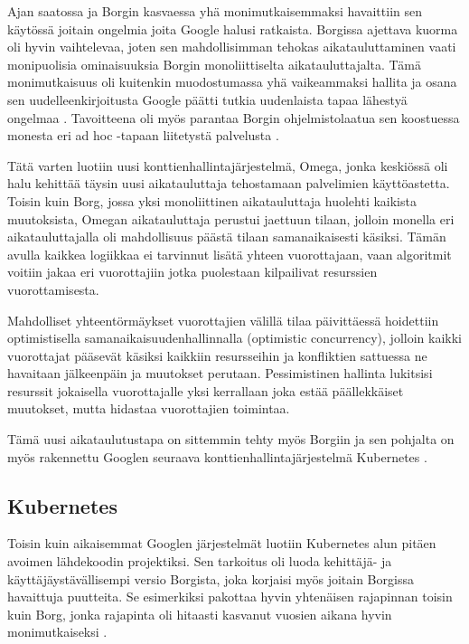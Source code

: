 \documentclass[finnish,gradu]{tktltiki3}
\begin{document}
    Ajan saatossa ja Borgin kasvaessa yhä monimutkaisemmaksi havaittiin sen käytössä joitain ongelmia joita Google halusi ratkaista. Borgissa ajettava kuorma oli hyvin vaihtelevaa, joten sen mahdollisimman tehokas aikatauluttaminen vaati monipuolisia ominaisuuksia Borgin monoliittiselta aikatauluttajalta. Tämä monimutkaisuus oli kuitenkin muodostumassa yhä vaikeammaksi hallita ja osana sen uudelleenkirjoitusta Google päätti tutkia uudenlaista tapaa lähestyä ongelmaa \cite{omega}. Tavoitteena oli myös parantaa Borgin ohjelmistolaatua sen koostuessa monesta eri ad hoc -tapaan liitetystä palvelusta \cite{borg-omega-kubernetes}.
    
    Tätä varten luotiin uusi konttienhallintajärjestelmä, Omega, jonka keskiössä oli halu kehittää täysin uusi aikatauluttaja tehostamaan palvelimien käyttöastetta. Toisin kuin Borg, jossa yksi monoliittinen aikatauluttaja huolehti kaikista muutoksista, Omegan aikatauluttaja perustui jaettuun tilaan, jolloin monella eri aikatauluttajalla oli mahdollisuus päästä tilaan samanaikaisesti käsiksi. Tämän avulla kaikkea logiikkaa ei tarvinnut lisätä yhteen vuorottajaan, vaan algoritmit voitiin jakaa eri vuorottajiin jotka puolestaan kilpailivat resurssien vuorottamisesta.
    
    Mahdolliset yhteentörmäykset vuorottajien välillä tilaa päivittäessä hoidettiin optimistisella samanaikaisuudenhallinnalla (optimistic concurrency), jolloin kaikki vuorottajat pääsevät käsiksi kaikkiin resursseihin ja konfliktien sattuessa ne havaitaan jälkeenpäin ja muutokset perutaan. Pessimistinen hallinta lukitsisi resurssit jokaisella vuorottajalle yksi kerrallaan joka estää päällekkäiset muutokset, mutta hidastaa vuorottajien toimintaa.
    
    Tämä uusi aikataulutustapa on sittemmin tehty myös Borgiin ja sen pohjalta on myös rakennettu Googlen seuraava konttienhallintajärjestelmä Kubernetes \cite{omega}.
    
    \subsection{Kubernetes}
    
    Toisin kuin aikaisemmat Googlen järjestelmät luotiin Kubernetes alun pitäen avoimen lähdekoodin projektiksi. Sen tarkoitus oli luoda kehittäjä- ja käyttäjäystävällisempi versio Borgista, joka korjaisi myös joitain Borgissa havaittuja puutteita. Se esimerkiksi pakottaa hyvin yhtenäisen rajapinnan toisin kuin Borg, jonka rajapinta oli hitaasti kasvanut vuosien aikana hyvin monimutkaiseksi \cite{borg-omega-kubernetes}.
    
\end{document}
